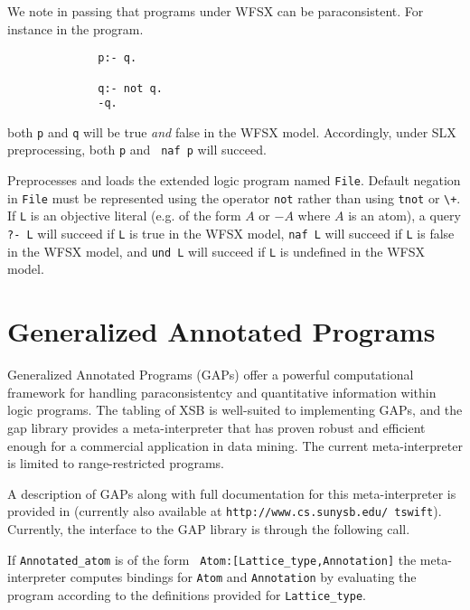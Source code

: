 We note in passing that programs under WFSX can be paraconsistent.
For instance in the program.
{\small
\begin{verbatim}
              p:- q.

              q:- not q.
              -q.
\end{verbatim}
}
both {\tt p} and {\tt q} will be true {\em and} false in the WFSX
model.  Accordingly, under SLX preprocessing, both {\tt p} and {\tt
naf p} will succeed.

\begin{description}
Preprocesses and loads the extended logic program named {\tt File}.
Default negation in {\tt File} must be represented using the operator
{\tt not} rather than using {\tt tnot} or \verb|\+|.  If {\tt L} is an
objective literal (e.g. of the form $A$ or $-A$ where $A$ is an atom),
a query {\tt ?- L} will succeed if {\tt L} is true in the WFSX model,
{\tt naf L} will succeed if {\tt L} is false in the WFSX model, and
{\tt und L} will succeed if {\tt L} is undefined in the WFSX model.
\end{description}


\section{Generalized Annotated Programs}  \label{library_utilities:gap}

Generalized Annotated Programs (GAPs) \cite{KiSu92} offer a powerful
computational framework for handling paraconsistentcy and quantitative
information within logic programs.  The tabling of XSB is well-suited
to implementing GAPs, and the gap library provides a meta-interpreter
that has proven robust and efficient enough for a commercial
application in data mining.  The current meta-interpreter is limited
to range-restricted programs.

A description of GAPs along with full documentation for this
meta-interpreter is provided in \cite{Swif99a} (currently also
available at {\tt http://www.cs.sunysb.edu/~tswift}).  Currently, the
interface to the GAP library is through the following call.

\begin{description}
%
If {\tt Annotated\_atom} is of the form {\tt
Atom:[Lattice\_type,Annotation]} the meta-interpreter computes bindings
for {\tt Atom} and {\tt Annotation} by evaluating the program
according to the definitions provided for {\tt Lattice\_type}.
\end{description}

